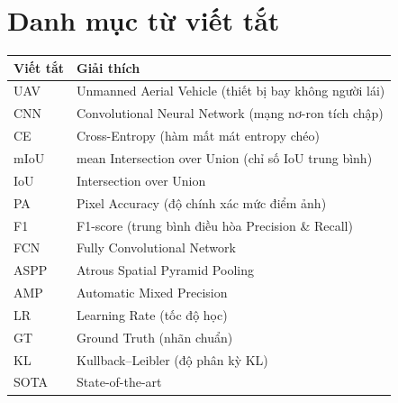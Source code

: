 \chapter*{Danh mục từ viết tắt}

\begin{center}
\begin{tabular}{l l}
\toprule
\textbf{Viết tắt} & \textbf{Giải thích} \\
\midrule
UAV    & Unmanned Aerial Vehicle (thiết bị bay không người lái) \\
CNN    & Convolutional Neural Network (mạng nơ-ron tích chập) \\
CE     & Cross-Entropy (hàm mất mát entropy chéo) \\
mIoU   & mean Intersection over Union (chỉ số IoU trung bình) \\
IoU    & Intersection over Union \\
PA     & Pixel Accuracy (độ chính xác mức điểm ảnh) \\
F1     & F1-score (trung bình điều hòa Precision \& Recall) \\
FCN    & Fully Convolutional Network \\
ASPP   & Atrous Spatial Pyramid Pooling \\
AMP    & Automatic Mixed Precision \\
LR     & Learning Rate (tốc độ học) \\
GT     & Ground Truth (nhãn chuẩn) \\
KL     & Kullback--Leibler (độ phân kỳ KL) \\
SOTA   & State-of-the-art \\
\bottomrule
\end{tabular}
\end{center}


